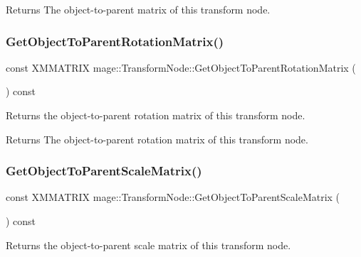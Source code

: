 \begin{DoxyReturn}{Returns}
The object-\/to-\/parent matrix of this transform node. 
\end{DoxyReturn}
\hypertarget{classmage_1_1_transform_node_ae72c1a89c45d21458e897522b0ae6842}{}\label{classmage_1_1_transform_node_ae72c1a89c45d21458e897522b0ae6842} 
\subsubsection{\texorpdfstring{Get\+Object\+To\+Parent\+Rotation\+Matrix()}{GetObjectToParentRotationMatrix()}}
{\footnotesize\ttfamily const X\+M\+M\+A\+T\+R\+IX mage\+::\+Transform\+Node\+::\+Get\+Object\+To\+Parent\+Rotation\+Matrix (\begin{DoxyParamCaption}{ }\end{DoxyParamCaption}) const}

Returns the object-\/to-\/parent rotation matrix of this transform node.

\begin{DoxyReturn}{Returns}
The object-\/to-\/parent rotation matrix of this transform node. 
\end{DoxyReturn}
\hypertarget{classmage_1_1_transform_node_a36cbdebf999dc41871446f12c129041d}{}\label{classmage_1_1_transform_node_a36cbdebf999dc41871446f12c129041d} 
\subsubsection{\texorpdfstring{Get\+Object\+To\+Parent\+Scale\+Matrix()}{GetObjectToParentScaleMatrix()}}
{\footnotesize\ttfamily const X\+M\+M\+A\+T\+R\+IX mage\+::\+Transform\+Node\+::\+Get\+Object\+To\+Parent\+Scale\+Matrix (\begin{DoxyParamCaption}{ }\end{DoxyParamCaption}) const}

Returns the object-\/to-\/parent scale matrix of this transform node.

